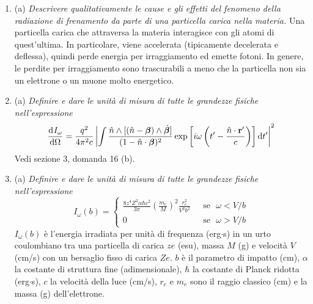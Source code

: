 \documentclass{article}
\renewcommand{\a}{(a)}
\renewcommand{\b}{(b)}
\renewcommand{\t}[1]{\textit{ #1}}
\renewcommand{\vec}[1]{\mathbf{#1}}
\begin{document}
\begin{enumerate}
{		Cherenkov: \begin{align*}\frac{\d^2 N_\gamma}{\d E_\gamma\d x}&= z^2 \frac{\alpha}{\hbar c}	\sin^2\theta_c\\N_\gamma &= z^2\frac{\alpha}{\hbar c}L\int_{E_1}^{E_2}\left[1-\frac{1}{\beta^2\varepsilon_r(E)}\right]P_\mathrm{det}(E)\d E
		\end{align*}} Nella prima espressione, il termine a primo membro è il numero di fotoni emesso per unità di frequenza e unità di lunghezza percorsa dalla particella (a parte un fattore $\hbar$). A secondo membro invece $z$ è la carica della particella in unità di $e$, $\alpha=e^2/\hbar c$ è la costante di struttura fine e $\theta_c$ è l'angolo mostrato nella figura precedente. Nella seconda espressione, $N_\gamma$ è il numero totale di fotoni rilevati da un detector di efficienza $P_\textrm{det}$ che può rilevare fotoni con energia compresa tra $E_1$ e $E_2$. $L$ è la lunghezza del dielettrico.
	\item\a\t{Descrivere qualitativamente le cause e gli effetti del fenomeno della radiazione di
		frenamento da parte di una particella carica nella materia.} Una particella carica che attraversa la materia interagisce con gli atomi di quest'ultima. In particolare, viene accelerata (tipicamente decelerata e deflessa), quindi perde energia per irraggiamento ed emette fotoni. In genere, le perdite per irraggiamento sono trascurabili a meno che la particella non sia un elettrone o un muone molto energetico.
	\item\a\t{Definire e dare le unità di misura di tutte le grandezze fisiche nell'espressione
		\[\der{I_\omega}{\Omega}=\frac{q^2}{4\pi^2c}\left|\int\frac{\hat{n}\wedge[(\hat{n}-\bm{\beta})\wedge\dot{\bm{\beta}}]}{(1-\hat{n}\cdot\bm{\beta})^2}\exp\left[i\omega\left(t'-\frac{\hat{n}\cdot\vec{r}'}{c}\right)\right]\d t'\right|^2\]} Vedi sezione 3, domanda 16 \b.
	\item\a\t{Definire e dare le unità di misura di tutte le grandezze fisiche nell'espressione\[I_\omega(b)=\begin{cases}
	\frac{8z^4Z^2\alpha\hbar c^2}{3\pi}\left(\frac{m_e}{M}\right)^2\frac{r_e^2}{V^2b^2}&\textrm{ }\mathrm{se}\textrm{ }\omega<V/b\\0&\textrm{ }\mathrm{se}\textrm{ }\omega>V/b
		\end{cases}\]}
	$I_\omega(b)$ è l'energia irradiata per unità di frequenza (erg$\cdot$s) in un urto coulombiano tra una particella di carica $ze$ (esu), massa $M$ (g) e velocità $V$ (cm/s) con un bersaglio fisso di carica $Ze$. $b$ è il parametro di impatto (cm), $\alpha$ la costante di struttura fine (adimensionale), $\hbar$ la costante di Planck ridotta (erg$\cdot$s), $c$ la velocità della luce (cm/s), $r_e$ e $m_e$ sono il raggio classico (cm) e la massa (g) dell'elettrone.

\end{enumerate}
\end{document}

